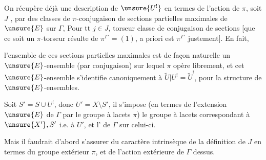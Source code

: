 On récupère déjà une description de \(\unsure{U^!}\) en termes de
l'action de \(\pi\), soit \(J\) ,
par des classes de \(\pi\)-conjugaison
de sections partielles  maximales de
\(\unsure{E}\) sur \(\Gamma\),
Pour tt \(j\in J\),  \inserted{\(\pi\)-}torseur
classe de \inserted{\(\pi\)-}conjugaison de sections
[que ce soit un \(\pi\)-torseur résulte de
\(\pi^{\Gamma'}=(1)\), a priori
est \(\pi^{\Gamma'}\) justement].
En fait,



l'ensemble de  ces  sections
partielles maximales est de façon naturelle un \(\unsure{E}\)-ensemble
(par conjugaison) sur lequel \(\pi\) opère librement, et cet
\(\unsure{E}\)-ensemble s'identifie canoniquement à
\(\widetilde U|U^!=\widetilde U^!\), pour la structure de
\(\unsure{E}\)-ensembles.

Soit \(S'=S\cup U^!\), donc \(U'=X\setminus S'\),
il s'impose 
(en termes de l'extension \(\unsure{E}\) de \(\Gamma\) par le groupe à
lacets \(\pi\)) le groupe  à lacets correspondant
à \(\unsure{X'},S'\) i.e. à \(U'\), et l'
 de \(\Gamma\) sur celui-ci.

Mais il faudrait d'abord s'assurer du caractère intrinsèque de la
définition de \(J\) 
en termes du  
groupe extérieur \(\pi\), et de l'action
 extérieure de \(\Gamma\) dessus.



